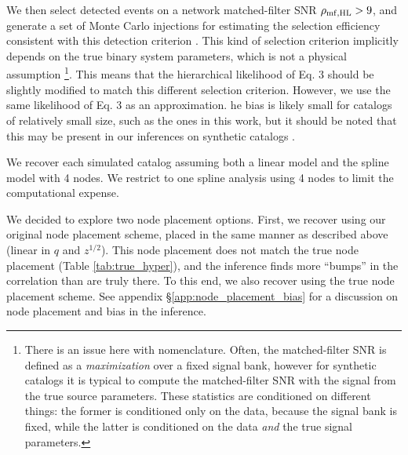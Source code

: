 \begin{refsection}
We then select detected events on a network matched-filter SNR $\rho_{\rm mf, HL} > 9$, and generate a set of Monte Carlo injections for estimating the selection efficiency consistent with this detection criterion \cite{Essick:2023toz}. This kind of selection criterion implicitly depends on the true binary system parameters, which is not a physical assumption \footnote{There is an issue here with nomenclature. Often, the matched-filter SNR is defined as a \textit{maximization} over a fixed signal bank, however for synthetic catalogs it is typical to compute the matched-filter SNR with the signal from the true source parameters. These statistics are conditioned on different things: the former is conditioned only on the data, because the signal bank is fixed, while the latter is conditioned on the data \textit{and} the true signal parameters.}. This means that the hierarchical likelihood of Eq. 3 should be slightly modified to match this different selection criterion. However, we use the same likelihood of Eq. 3 as an approximation. he bias is likely small for catalogs of relatively small size, such as the ones in this work, but it should be noted that this may be present in our inferences on synthetic catalogs \cite{Essick:2023upv}.

We recover each simulated catalog assuming both a linear model and the spline model with 4 nodes. We restrict to one spline analysis using 4 nodes to limit the computational expense. 

We decided to explore two node placement options. First, we recover using our original node placement scheme, placed in the same manner as described above (linear in $q$ and $z^{1/2}$). This node placement does not match the true node placement (Table \ref{tab:true_hyper}), and the inference finds more ``bumps'' in the correlation than are truly there. To this end, we also recover using the true node placement scheme. See appendix \S \ref{app:node_placement_bias} for a discussion on node placement and bias in the inference.



\end{refsection}
